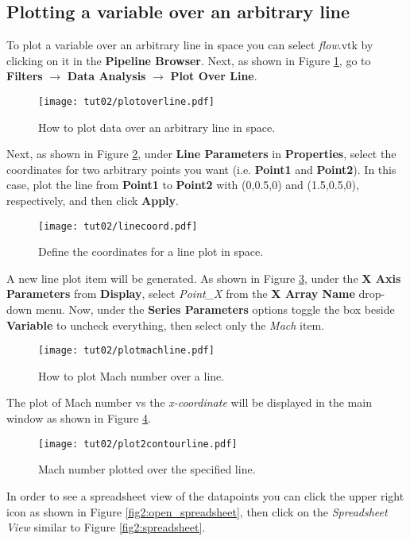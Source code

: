 \subsection{Plotting a variable over an arbitrary line}
To plot a variable over an arbitrary line in space you can select \textit{flow}.vtk by clicking on it in the \textbf{Pipeline Browser}. Next, as shown in Figure \ref{fig2:plot_over_line}, go to \textbf{Filters} $\rightarrow$  \textbf{Data Analysis} $\rightarrow$  \textbf{Plot Over Line}.
\begin{figure}[htbp]
    \centering
    \texttt{[image: tut02/plotoverline.pdf]}
    \caption{How to plot data over an arbitrary line in space.}
    \label{fig2:plot_over_line}
\end{figure}
Next, as shown in Figure \ref{fig2:line_coordinate}, under \textbf{Line Parameters} in \textbf{Properties}, select the coordinates for two arbitrary points you want (i.e. \textbf{Point1} and \textbf{Point2}). In this case, plot the line from \textbf{Point1} to \textbf{Point2} with (0,0.5,0) and (1.5,0.5,0), respectively, and then click \textbf{Apply}.
\begin{figure}[htbp]
    \centering
    \texttt{[image: tut02/linecoord.pdf]}
    \caption{Define the coordinates for a line plot in space.}
    \label{fig2:line_coordinate}
\end{figure}
A new line plot item will be generated. As shown in Figure \ref{fig2:plot_line_setting}, under the \textbf{X Axis Parameters} from \textbf{Display}, select \textit{Point\_X} from the \textbf{X Array Name} drop-down menu. Now, under the \textbf{Series Parameters} options toggle the box beside \textbf{Variable} to uncheck everything, then select only the \textit{Mach} item.
\begin{figure}[htbp]
    \centering
    \texttt{[image: tut02/plotmachline.pdf]}
    \caption{How to plot Mach number over a line.}
    \label{fig2:plot_line_setting}
\end{figure}
The plot of Mach number vs the \textit{x-coordinate} will be displayed in the main window as shown in Figure \ref{fig2:plot_line}.
\begin{figure}[htbp]
    \centering
    \texttt{[image: tut02/plot2contourline.pdf]}
    \caption{Mach number plotted over the specified line.}
    \label{fig2:plot_line}
\end{figure}
In order to see a spreadsheet view of the datapoints you can click the upper right icon as shown in Figure \ref{fig2:open_spreadsheet}, then click on the \textit{Spreadsheet View} similar to Figure \ref{fig2:spreadsheet}.
